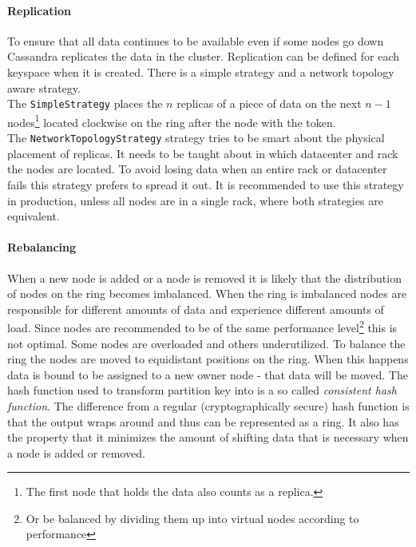 \paragraph{Replication} To ensure that all data continues to be available even if some nodes go down Cassandra replicates the data in the cluster. Replication can be defined for each keyspace when it is created. There is a simple strategy and a network topology aware strategy. \autocite{datastax_replication} \\
The \texttt{SimpleStrategy} places the $n$ replicas of a piece of data on the next $n-1$ nodes\footnote{The first node that holds the data also counts as a replica.} located clockwise on the ring after the node with the token. \autocite[3]{cassandra_paper} \\
The \texttt{NetworkTopologyStrategy} strategy tries to be smart about the physical placement of replicas. It needs to be taught about in which datacenter and rack the nodes are located. To avoid losing data when an entire rack or datacenter fails this strategy prefers to spread it out.
It is recommended to use this strategy in production, unless all nodes are in a single rack, where both strategies are equivalent.

\paragraph{Rebalancing}

When a new node is added or a node is removed it is likely that the distribution of nodes on the ring becomes imbalanced. When the ring is imbalanced nodes are responsible for different amounts of data and experience different amounts of load. Since nodes are recommended to be of the same performance level\footnote{Or be balanced by dividing them up into virtual nodes according to performance} this is not optimal. Some nodes are overloaded and others underutilized.
To balance the ring the nodes are moved to equidistant positions on the ring. When this happens data is bound to be assigned to a new owner node - that data will be moved. \autocite{datastax_balancing}
The hash function used to transform partition key into is a so called \textit{consistent hash function}. The difference from a regular (cryptographically secure) hash function is that the output wraps around and thus can be represented as a ring. It also has the property that it minimizes the amount of shifting data that is necessary when a node is added or removed. \autocite{karger1997consistent}

